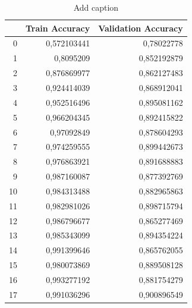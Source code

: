 \documentclass{beamer}
\begin{document}
\begin{frame}
\begin{table}[htbp]
  \centering
  \caption{Add caption}
    \begin{tabular}{|rrr|}
    \toprule
    \rowcolor[rgb]{ .439,  .678,  .278} \multicolumn{1}{|l}{\textcolor[rgb]{ 1,  1,  1}{\textbf{Colonne1}}} & \multicolumn{1}{l}{\textcolor[rgb]{ 1,  1,  1}{\textbf{Train Accuracy}}} & \multicolumn{1}{l|}{\textcolor[rgb]{ 1,  1,  1}{\textbf{Validation Accuracy}}} \\
    \midrule
    \rowcolor[rgb]{ .886,  .937,  .855} 0     & 0,572103441 & 0,78022778 \\
    \midrule
    1     & 0,8095209 & 0,852192879 \\
    \midrule
    \rowcolor[rgb]{ .886,  .937,  .855} 2     & 0,876869977 & 0,862127483 \\
    \midrule
    3     & 0,924414039 & 0,868912041 \\
    \midrule
    \rowcolor[rgb]{ .886,  .937,  .855} 4     & 0,952516496 & 0,895081162 \\
    \midrule
    5     & 0,966204345 & 0,892415822 \\
    \midrule
    \rowcolor[rgb]{ .886,  .937,  .855} 6     & 0,97092849 & 0,878604293 \\
    \midrule
    7     & 0,974259555 & 0,899442673 \\
    \midrule
    \rowcolor[rgb]{ .886,  .937,  .855} 8     & 0,976863921 & 0,891688883 \\
    \midrule
    9     & 0,987160087 & 0,877392769 \\
    \midrule
    \rowcolor[rgb]{ .886,  .937,  .855} 10    & 0,984313488 & 0,882965863 \\
    \midrule
    11    & 0,982981026 & 0,898715794 \\
    \midrule
    \rowcolor[rgb]{ .886,  .937,  .855} 12    & 0,986796677 & 0,865277469 \\
    \midrule
    13    & 0,985343099 & 0,894354224 \\
    \midrule
    \rowcolor[rgb]{ .886,  .937,  .855} 14    & 0,991399646 & 0,865762055 \\
    \midrule
    15    & 0,980073869 & 0,889508128 \\
    \midrule
    \rowcolor[rgb]{ .886,  .937,  .855} 16    & 0,993277192 & 0,881754279 \\
    \midrule
    17    & 0,991036296 & \cellcolor[rgb]{ 1,  .922,  .612}\textcolor[rgb]{ .612,  .341,  0}{0,900896549} \\

\end{tabular}
\end{table}
\end{frame}
\end{document}
